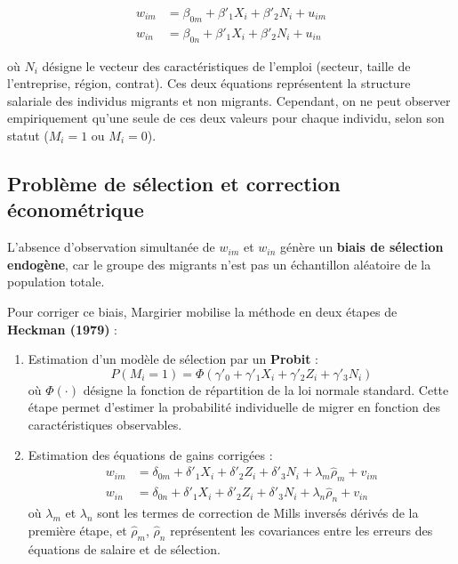 \documentclass[12pt,a4paper]{article}
\begin{document}
\begin{align}
w_{im} &= \beta_{0m} + \beta'_1 X_i + \beta'_2 N_i + u_{im} \\
w_{in} &= \beta_{0n} + \beta'_1 X_i + \beta'_2 N_i + u_{in}
\end{align}

où $N_i$ désigne le vecteur des caractéristiques de l’emploi (secteur, taille de l’entreprise, région, contrat).  
Ces deux équations représentent la structure salariale des individus migrants et non migrants.  
Cependant, on ne peut observer empiriquement qu’une seule de ces deux valeurs pour chaque individu, selon son statut ($M_i = 1$ ou $M_i = 0$).

\subsection{Problème de sélection et correction économétrique}

L’absence d’observation simultanée de $w_{im}$ et $w_{in}$ génère un \textbf{biais de sélection endogène}, car le groupe des migrants n’est pas un échantillon aléatoire de la population totale.

Pour corriger ce biais, Margirier mobilise la méthode en deux étapes de \textbf{Heckman (1979)} :
\begin{enumerate}
    \item Estimation d’un modèle de sélection par un \textbf{Probit} :
    \[
    P(M_i = 1) = \Phi(\gamma'_0 + \gamma'_1 X_i + \gamma'_2 Z_i + \gamma'_3 N_i)
    \]
    où $\Phi(\cdot)$ désigne la fonction de répartition de la loi normale standard.  
    Cette étape permet d’estimer la probabilité individuelle de migrer en fonction des caractéristiques observables.
    
    \item Estimation des équations de gains corrigées :
    \begin{align}
    w_{im} &= \delta_{0m} + \delta'_1 X_i + \delta'_2 Z_i + \delta'_3 N_i + \lambda_m \hat{\rho}_m + v_{im} \\
    w_{in} &= \delta_{0n} + \delta'_1 X_i + \delta'_2 Z_i + \delta'_3 N_i + \lambda_n \hat{\rho}_n + v_{in}
    \end{align}
    où $\lambda_m$ et $\lambda_n$ sont les termes de correction de Mills inversés dérivés de la première étape, et $\hat{\rho}_m$, $\hat{\rho}_n$ représentent les covariances entre les erreurs des équations de salaire et de sélection.
\end{enumerate}
\end{document}
